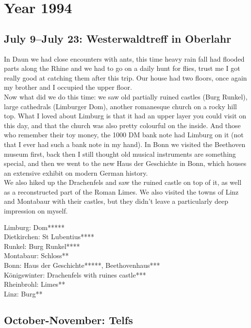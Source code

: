 \chapter{Year 1994}
\label{1994}

\section{July 9--July 23: Westerwaldtreff in Oberlahr}
\label{1994:Westerwald}

In Daun we had close encounters with ants, this time heavy rain fall had flooded parts along the Rhine and we had to go on a daily hunt for flies, trust me I got really good at catching them after this trip. Our house had two floors, once again my brother and I occupied the upper floor.\\

Now what did we do this time: we saw old partially ruined castles (Burg Runkel), large cathedrals (Limburger Dom), another romanesque church on a rocky hill top. What I loved about Limburg is that it had an upper layer you could visit on this day, and that the church was also pretty colourful on the inside. And those who remember their toy money, the 1000 DM bank note had Limburg on it (not that I ever had such a bank note in my hand). In Bonn we visited the Beethoven museum first, back then I still thought old musical instruments are something special, and then we went to the new Haus der Geschichte in Bonn, which houses an extensive exhibit on modern German history.\\
We also hiked up the Drachenfels and saw the ruined castle on top of it, as well as a reconstructed part of the Roman Limes. We also visited the towns of Linz and Montabaur with their castles, but they didn't leave a particularly deep impression on myself.


Limburg: Dom*****\\
Dietkirchen: St Lubentius****\\
Runkel: Burg Runkel****\\
Montabaur: Schloss**\\
Bonn: Haus der Geschichte*****, Beethovenhaus***\\
K\"onigswinter: Drachenfels with ruines castle***\\
Rheinbrohl: Limes**\\
Linz: Burg**\\

\section{October-November: Telfs}
\label{1994:Telfs}

